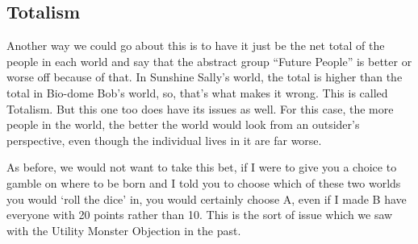 \subsection{Totalism}

Another way we could go about this is to have it just be the net total of the people in each world and say that the abstract group “Future People” is better or worse off because of that. In Sunshine Sally’s world, the total is higher than the total in Bio-dome Bob’s world, so, that’s what makes it wrong. This is called Totalism. But this one too does have its issues as well. For this case, the more people in the world, the better the world would look from an outsider's perspective, even though the individual lives in it are far worse.


As before, we would not want to take this bet, if I were to give you a choice to gamble on where to be born and I told you to choose which of these two worlds you would `roll the dice' in, you would certainly choose A, even if I made B have everyone with 20 points rather than 10. This is the sort of issue which we saw with the Utility Monster Objection in the past.